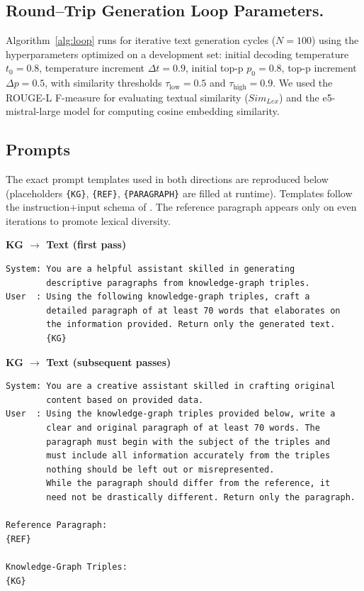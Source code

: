 \documentclass[11pt]{article}
\begin{document}
\subsection{Round–Trip Generation Loop Parameters. }
\label{ssec:loop-config}
Algorithm~\ref{alg:loop} runs for iterative text generation cycles (\( N = 100 \)) using the hyperparameters optimized on a development set: initial decoding temperature \( t_0 = 0.8 \), temperature increment \( \Delta t = 0.9 \), initial top-p \( p_0 = 0.8 \), top-p increment \( \Delta p = 0.5 \), with similarity thresholds \( \tau_{\text{low}} = 0.5 \) and \( \tau_{\text{high}} = 0.9 \). We used the ROUGE-L F-measure for evaluating textual similarity ($Sim_{Lex}$) and the e5-mistral-large model for computing cosine embedding similarity.
\subsection{Prompts}
\label{ssec:prompts}

The exact prompt templates used in both directions are reproduced
below (placeholders \texttt{\{KG\}}, \texttt{\{REF\}},
\texttt{\{PARAGRAPH\}} are filled at runtime).  
Templates follow the instruction\(+\)input schema of
\citet{liu2024best}.  The reference paragraph appears only on even
iterations to promote lexical diversity.

\vspace{0.3em}
\noindent\textbf{KG $\rightarrow$ Text (first pass)}
\begin{lstlisting}[style=prompt]
System: You are a helpful assistant skilled in generating
        descriptive paragraphs from knowledge-graph triples.
User  : Using the following knowledge-graph triples, craft a
        detailed paragraph of at least 70 words that elaborates on
        the information provided. Return only the generated text.
        {KG}
\end{lstlisting}

\noindent\textbf{KG $\rightarrow$ Text (subsequent passes)}
\begin{lstlisting}[style=prompt]
System: You are a creative assistant skilled in crafting original
        content based on provided data.
User  : Using the knowledge-graph triples provided below, write a
        clear and original paragraph of at least 70 words. The
        paragraph must begin with the subject of the triples and
        must include all information accurately from the triples
        nothing should be left out or misrepresented.
        While the paragraph should differ from the reference, it
        need not be drastically different. Return only the paragraph.

Reference Paragraph:
{REF}

Knowledge-Graph Triples:
{KG}
\end{lstlisting}
\end{document}
